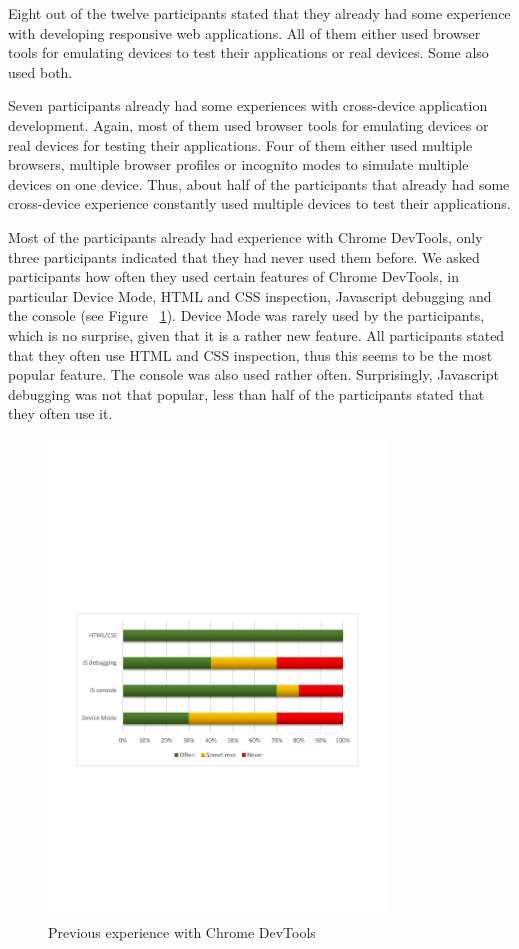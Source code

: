 Eight out of the twelve participants stated that they already had some experience with developing responsive web applications. All of them either used browser tools for emulating devices to test their applications or real devices. Some also used both.

Seven participants already had some experiences with cross-device application development. Again, most of them used browser tools for emulating devices or real devices for testing their applications. Four of them either used multiple browsers, multiple browser profiles or incognito modes to simulate multiple devices on one device. Thus, about half of the participants that already had some cross-device experience constantly used multiple devices to test their applications.

Most of the participants already had experience with Chrome DevTools, only three participants indicated that they had never used them before. We asked participants how often they used certain features of Chrome DevTools, in particular Device Mode, HTML and CSS inspection, Javascript debugging and the console (see Figure ~\ref{fig:devtools_xp}). Device Mode was rarely used by the participants, which is no surprise, given that it is a rather new feature. All participants stated that they often use HTML and CSS inspection, thus this seems to be the most popular feature. The console was also used rather often. Surprisingly, Javascript debugging was not that popular, less than half of the participants stated that they often use it.

\begin{figure}[H]
  \centering
    \includegraphics[width=0.8\textwidth]{images/charts/devtools_xp.pdf}
	\caption{Previous experience with Chrome DevTools}
	\label{fig:devtools_xp}
\end{figure}

